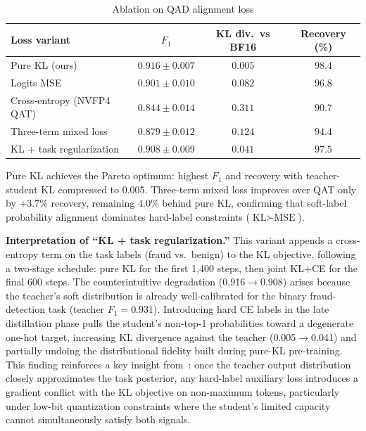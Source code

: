 \documentclass[11pt, a4paper]{article}
\begin{document}
\begin{table}[htbp]
\centering
\caption{Ablation on QAD alignment loss}
\label{tab5-en}
\small
\renewcommand{\arraystretch}{1.25}
\begin{tabular}{lccc}
\toprule
\textbf{Loss variant} & \textbf{$F_1$} & \textbf{KL div.\ vs BF16} & \textbf{Recovery (\%)} \\
\midrule
Pure KL (ours) & $\mathbf{0.916 \pm 0.007}$ & $\mathbf{0.005}$ & $\mathbf{98.4}$ \\
Logits MSE & $0.901 \pm 0.010$ & $0.082$ & $96.8$ \\
Cross-entropy (NVFP4 QAT) & $0.844 \pm 0.014$ & $0.311$ & $90.7$ \\
Three-term mixed loss & $0.879 \pm 0.012$ & $0.124$ & $94.4$ \\
KL + task regularization & $0.908 \pm 0.009$ & $0.041$ & $97.5$ \\
\bottomrule
\end{tabular}
\end{table}

Pure KL achieves the Pareto optimum: highest $F_1$ and recovery with teacher-student KL compressed to 0.005. Three-term mixed loss improves over QAT only by $+3.7\%$ recovery, remaining $4.0\%$ behind pure KL, confirming that soft-label probability alignment dominates hard-label constraints ($\text{KL}\succ \text{MSE}$).

\medskip
\noindent\textbf{Interpretation of ``KL + task regularization.''} This variant appends a cross-entropy term on the task labels (fraud vs.\ benign) to the KL objective, following a two-stage schedule: pure KL for the first 1{,}400 steps, then joint KL+CE for the final 600 steps. The counterintuitive degradation (0.916$\rightarrow$0.908) arises because the teacher's soft distribution is already well-calibrated for the binary fraud-detection task (teacher $F_1 = 0.931$). Introducing hard CE labels in the late distillation phase pulls the student's non-top-1 probabilities toward a degenerate one-hot target, increasing KL divergence against the teacher (0.005$\rightarrow$0.041) and partially undoing the distributional fidelity built during pure-KL pre-training. This finding reinforces a key insight from~\cite{3}: once the teacher output distribution closely approximates the task posterior, any hard-label auxiliary loss introduces a gradient conflict with the KL objective on non-maximum tokens, particularly under low-bit quantization constraints where the student's limited capacity cannot simultaneously satisfy both signals.
\end{document}
